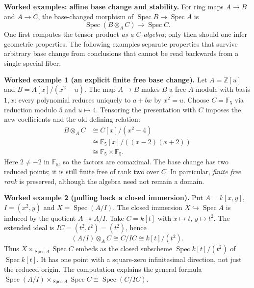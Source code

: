 \par\medskip
\noindent\textbf{Worked examples: affine base change and stability.}
For ring maps $A\to B$ and $A\to C$, the base-changed morphism of
$\operatorname{Spec}B\to\operatorname{Spec}A$ is
\[
\operatorname{Spec}(B\otimes_A C)\longrightarrow\operatorname{Spec}C.
\]
One first computes the tensor product \emph{as a $C$-algebra}; only then
should one infer geometric properties.  The following examples separate
properties that survive arbitrary base change from conclusions that cannot
be read backwards from a single special fiber.

\par\medskip
\noindent\textbf{Worked example 1 (an explicit finite free base change).}
Let $A=\mathbb Z[u]$ and $B=A[x]/(x^2-u)$.  The map
$A\to B$ makes $B$ a free $A$-module with basis $1,x$:
every polynomial reduces uniquely to $a+bx$ by $x^2=u$.
Choose $C=\mathbb F_5$ via reduction modulo $5$ and $u\mapsto4$.
Tensoring the presentation with $C$ imposes the new coefficients and
the old defining relation:
\[
\begin{aligned}
B\otimes_A C
 &\cong C[x]/(x^2-4)\\
 &\cong\mathbb F_5[x]/((x-2)(x+2))\\
 &\cong\mathbb F_5\times\mathbb F_5.
\end{aligned}
\]
Here $2\ne-2$ in $\mathbb F_5$, so the factors are comaximal.
The base change has two reduced points; it is still finite free of
rank two over $C$.  In particular, \emph{finite free rank} is preserved,
although the algebra need not remain a domain.

\par\medskip
\noindent\textbf{Worked example 2 (pulling back a closed immersion).}
Put $A=k[x,y]$, $I=(x^2,y)$ and $X=\operatorname{Spec}(A/I)$.
The closed immersion $X\hookrightarrow\operatorname{Spec}A$ is induced
by the quotient $A\twoheadrightarrow A/I$.
Take $C=k[t]$ with $x\mapsto t$, $y\mapsto t^2$.
The extended ideal is $IC=(t^2,t^2)=(t^2)$, hence
\[
(A/I)\otimes_A C\cong C/IC\cong k[t]/(t^2).
\]
Thus $X\times_{\operatorname{Spec}A}\operatorname{Spec}C$
embeds as the closed subscheme $\operatorname{Spec}k[t]/(t^2)$ of
$\operatorname{Spec}k[t]$.  It has one point with a square-zero
infinitesimal direction, not just the reduced origin.
The computation explains the general formula
$\operatorname{Spec}(A/I)\times_{\operatorname{Spec}A}
\operatorname{Spec}C\cong\operatorname{Spec}(C/IC)$.

